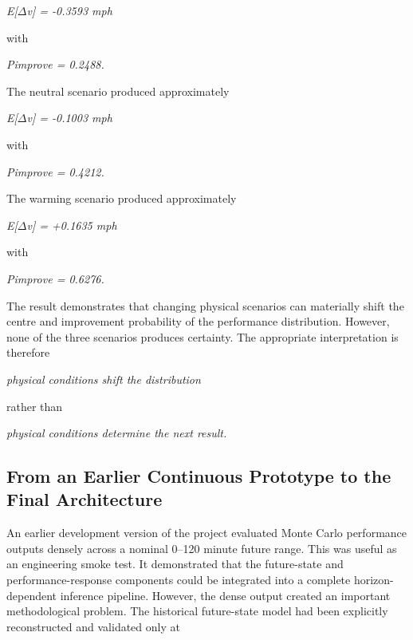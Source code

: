 \begin{center}\textit{E[\ensuremath{\Delta}v] = -0.3593 mph}\end{center}

with

\begin{center}\textit{Pimprove = 0.2488.}\end{center}

The neutral scenario produced approximately

\begin{center}\textit{E[\ensuremath{\Delta}v] = -0.1003 mph}\end{center}

with

\begin{center}\textit{Pimprove = 0.4212.}\end{center}

The warming scenario produced approximately

\begin{center}\textit{E[\ensuremath{\Delta}v] = +0.1635 mph}\end{center}

with

\begin{center}\textit{Pimprove = 0.6276.}\end{center}

The result demonstrates that changing physical scenarios can materially shift the centre and improvement probability of the performance distribution. However, none of the three scenarios produces certainty. The appropriate interpretation is therefore

\begin{center}\textit{physical conditions shift the distribution}\end{center}

rather than

\begin{center}\textit{physical conditions determine the next result.}\end{center}

\subsection{From an Earlier Continuous Prototype to the Final Architecture}
An earlier development version of the project evaluated Monte Carlo performance outputs densely across a nominal 0--120 minute future range. This was useful as an engineering smoke test. It demonstrated that the future-state and performance-response components could be integrated into a complete horizon-dependent inference pipeline. However, the dense output created an important methodological problem. The historical future-state model had been explicitly reconstructed and validated only at

